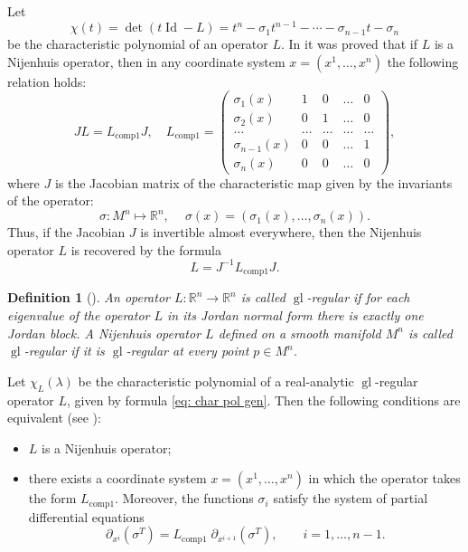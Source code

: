 \documentclass[12pt]{article}
\theoremstyle{plain}
\newtheorem{Definition}{Definition}
\begin{document}
Let  
\begin{equation} \label{eq: char pol gen}
    \chi(t)=\det(t\operatorname{Id}-L)=t^n-\sigma_1 t^{n-1}-\cdots-\sigma_{n-1}t-\sigma_n
\end{equation}
be the characteristic polynomial of an operator $L$. In \cite{bolsinov2022nijenhuisNGI} it was proved that if $L$ is a Nijenhuis operator, then in any  coordinate system $x=(x^1,\ldots,x^n)$ the following relation holds:
\begin{equation}\label{ngi form}
    J L = L_{\operatorname{comp1}} J, \quad 
    L_{\operatorname{comp1}} = \begin{pmatrix}
        \sigma_1(x) & 1 & 0 & \ldots & 0 \\
        \sigma_2(x) & 0 & 1 & \ldots & 0 \\
        \ldots & \ldots & \ldots & \ldots & \ldots \\
        \sigma_{n-1}(x) & 0 & 0 & \ldots & 1 \\
        \sigma_n(x) & 0 & 0 & \ldots & 0
    \end{pmatrix},
\end{equation}
where $J$ is the Jacobian matrix of the characteristic map given by the invariants of the operator:
\[
\sigma : M^n \mapsto \mathbb{R}^n, \quad  \
\sigma(x) = (\sigma_1(x),\ldots,\sigma_n(x)).
\]
Thus, if the Jacobian $J$ is invertible almost everywhere, then the Nijenhuis operator $L$ is recovered by the formula
\begin{equation}\label{reconst form}
    L = J^{-1} L_{\operatorname{comp1}} J.
\end{equation}

\begin{Definition}[\cite{bolsinov2024nijenhuisNGIII}]
    An operator $L:\mathbb{R}^n \to \mathbb{R}^n$ is called \textit{$\operatorname{gl}$-regular} if for each eigenvalue of the operator $L$ in its Jordan normal form there is exactly one Jordan block. A Nijenhuis operator $L$ defined on a smooth manifold $M^n$ is called \textit{$\operatorname{gl}$-regular} if it is $\operatorname{gl}$-regular at every point $p \in M^n$.
\end{Definition}

Let $\chi_L(\lambda)$ be the characteristic polynomial of a real-analytic $\operatorname{gl}$-regular operator $L$, given by formula \eqref{eq: char pol gen}. Then the following conditions are equivalent (see \cite{bolsinov2024nijenhuisNGIII}):
\begin{itemize}
    \item $L$ is a Nijenhuis operator;
    \item there exists a coordinate system $x=(x^1,\ldots,x^n)$ in which the operator takes the form $L_{\operatorname{comp1}}$.
    Moreover, the functions $\sigma_i$ satisfy the system of partial differential equations
    \begin{equation}\label{eq: gl-reg}
        \partial_{x^i}
       \left(\sigma^T \right)
        = L_{\operatorname{comp1}} \;
        \partial_{x^{i+1}}
       \left(\sigma^T \right),
        \qquad i=1,\ldots,n-1.
    \end{equation}
\end{itemize}
\end{document}
